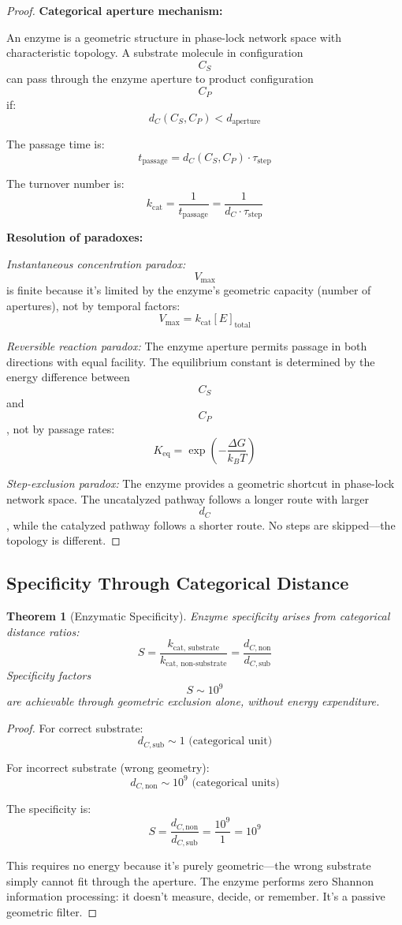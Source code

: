 \documentclass[12pt,a4paper]{article}
\newtheorem{theorem}{Theorem}
\begin{document}
\begin{proof}
\textbf{Categorical aperture mechanism:}

An enzyme is a geometric structure in phase-lock network space with characteristic topology. A substrate molecule in configuration $$C_S$$ can pass through the enzyme aperture to product configuration $$C_P$$ if:
$$
d_C(C_S, C_P) < d_{\text{aperture}}
$$

The passage time is:
$$
t_{\text{passage}} = d_C(C_S, C_P) \cdot \tau_{\text{step}}
$$

The turnover number is:
$$
k_{\text{cat}} = \frac{1}{t_{\text{passage}}} = \frac{1}{d_C \cdot \tau_{\text{step}}}
$$

\textbf{Resolution of paradoxes:}

\textit{Instantaneous concentration paradox:} $$V_{\max}$$ is finite because it's limited by the enzyme's geometric capacity (number of apertures), not by temporal factors:
$$
V_{\max} = k_{\text{cat}} [E]_{\text{total}}
$$

\textit{Reversible reaction paradox:} The enzyme aperture permits passage in both directions with equal facility. The equilibrium constant is determined by the energy difference between $$C_S$$ and $$C_P$$, not by passage rates:
$$
K_{\text{eq}} = \exp\left(-\frac{\Delta G}{k_B T}\right)
$$

\textit{Step-exclusion paradox:} The enzyme provides a geometric shortcut in phase-lock network space. The uncatalyzed pathway follows a longer route with larger $$d_C$$, while the catalyzed pathway follows a shorter route. No steps are skipped—the topology is different.
\end{proof}

\subsection{Specificity Through Categorical Distance}

\begin{theorem}[Enzymatic Specificity]
Enzyme specificity arises from categorical distance ratios:
$$
S = \frac{k_{\text{cat, substrate}}}{k_{\text{cat, non-substrate}}} = \frac{d_{C, \text{non}}}{d_{C, \text{sub}}}
$$
Specificity factors $$S \sim 10^9$$ are achievable through geometric exclusion alone, without energy expenditure.
\end{theorem}

\begin{proof}
For correct substrate:
$$
d_{C, \text{sub}} \sim 1 \text{ (categorical unit)}
$$

For incorrect substrate (wrong geometry):
$$
d_{C, \text{non}} \sim 10^9 \text{ (categorical units)}
$$

The specificity is:
$$
S = \frac{d_{C, \text{non}}}{d_{C, \text{sub}}} = \frac{10^9}{1} = 10^9
$$

This requires no energy because it's purely geometric—the wrong substrate simply cannot fit through the aperture. The enzyme performs zero Shannon information processing: it doesn't measure, decide, or remember. It's a passive geometric filter.
\end{proof}
\end{document}
